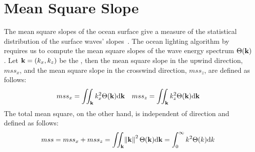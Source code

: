 \section{Mean Square Slope}
\label{app:mss}
%
The mean square slopes of the ocean surface give a measure of the
statistical distribution of the surface waves' slopes~\citep{Massel:2011}.
The ocean lighting algorithm by \cite{misc:oceanlightingfft} requires us to compute
the mean square slopes of the wave energy spectrum $\Theta(\mathbf{k})$.
Let $\mathbf{k} = (k_x, k_z)$ be the \wavevector,
then the mean square slope in the upwind direction, $mss_x$, and the mean square
slope in the crosswind direction, $mss_z$, are defined as follows:
\begin{align}
mss_x = \iint_{\mathbf{k}} k_x^2 \Theta(\mathbf{k}) \mathrm{d}\mathbf{k} &&
mss_z = \iint_{\mathbf{k}} k_z^2 \Theta(\mathbf{k}) \mathrm{d}\mathbf{k}
\end{align}
%
The total mean square, on the other hand, is independent of direction
and defined as follows:
\begin{equation}
mss = mss_x + mss_z = \iint_{\mathbf{k}} \norm{\mathbf{k}}^2 \Theta(\mathbf{k}) \mathrm{d}\mathbf{k} = \int_{0}^{\infty}k^2 \Theta(k)\mathrm{d}k
\end{equation}